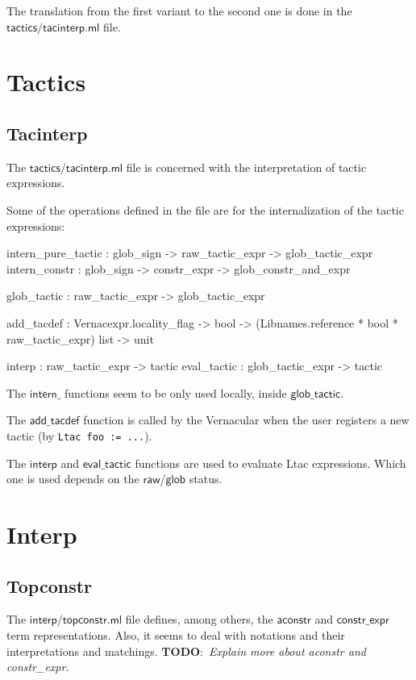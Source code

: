 \documentclass[a4paper,oneside]{book}
\newcommand{\m}[1]{\ensuremath{\mathsf{#1}}}
\newcommand{\TODO}[1]{\textbf{TODO}:\ \emph{#1}}
\begin{document}
The translation from the first variant to the second one is done in
the \m{tactics/tacinterp.ml} file.

\newpage

\section{Tactics}

\subsection{Tacinterp}

The \m{tactics/tacinterp.ml} file is concerned with the interpretation
of tactic expressions.

Some of the operations defined in the file are for the internalization
of the tactic expressions:

\begin{code}
intern_pure_tactic : glob_sign -> raw_tactic_expr -> glob_tactic_expr
intern_constr : glob_sign -> constr_expr -> glob_constr_and_expr

glob_tactic : raw_tactic_expr -> glob_tactic_expr

add_tacdef :
  Vernacexpr.locality_flag -> bool ->
  (Libnames.reference * bool * raw_tactic_expr) list -> unit

interp : raw_tactic_expr -> tactic
eval_tactic : glob_tactic_expr -> tactic
\end{code}

\noindent
The \m{intern\_} functions seem to be only used locally, inside
\m{glob\_tactic}.

The \m{add\_tacdef} function is called by the Vernacular when the user
registers a new tactic (by \verb|Ltac foo := ...|).

The \m{interp} and \m{eval\_tactic} functions are used to evaluate
Ltac expressions. Which one is used depends on the \m{raw}/\m{glob}
status.

\newpage

\section{Interp}

\subsection{Topconstr}

The \m{interp/topconstr.ml} file defines, among others, the
\m{aconstr} and \m{constr\_expr} term representations. Also, it seems
to deal with notations and their interpretations and
matchings. \TODO{Explain more about aconstr and constr\_expr}.
\end{document}

